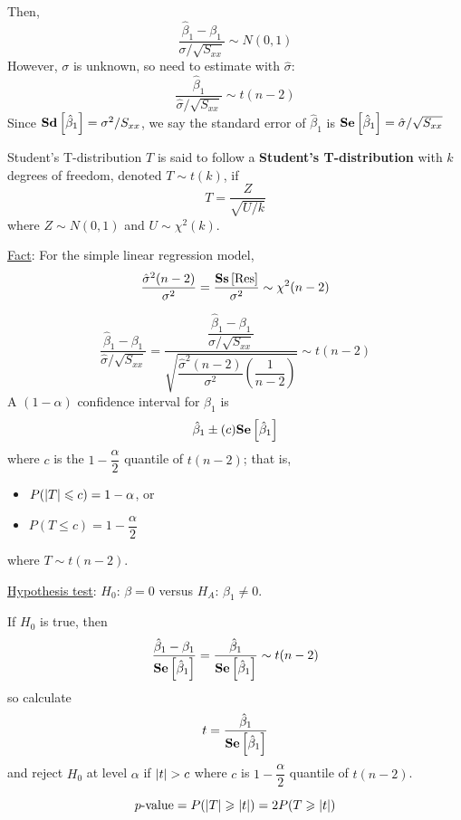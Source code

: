 Then,
\[ \frac{\hat{\beta}_1-\beta_1}{\sigma/\sqrt{S_{xx}}} \sim N(0,1)  \]
However, $ \sigma $ is unknown, so need to estimate
with $ \hat{\sigma} $:
\[ \frac{\hat{\beta}_1}{\hat{\sigma}/\sqrt{S_{xx}}}
    \sim t(n-2)  \]
Since $ \bm{\mathrm{Sd}}\left[\hat{\beta}_1\right]=\sigma^2/S_{xx} $,
we say the standard error of $ \hat{\beta}_1 $ is
$ \bm{\mathrm{Se}}\left[\hat{\beta}_1\right]=\hat{\sigma}/\sqrt{S_{xx}} $
\begin{Definition}{Student's T-distribution}{}
    $ T $ is said to follow a \textbf{Student's T-distribution} with
    $ k $ degrees of freedom, denoted $ T \sim t(k) $, if
    \[ T=\frac{Z}{\sqrt{U/k}}  \]
    where $ Z \sim N(0,1) $ and $ U \sim \chi^2(k) $.
\end{Definition}

\underline{Fact}\@: For the simple linear regression model,
\[ \frac{\hat{\sigma}^2(n-2)}{\sigma^2}=\frac{\bm{\mathrm{Ss}}\left[\text{Res}\right]}{\sigma^2}
    \sim \chi^2(n-2)  \]

\[ \frac{\hat{\beta}_1-\beta_1}{\hat{\sigma}/\sqrt{S_{xx}}}
    =\dfrac{\dfrac{\hat{\beta}_1-\beta_1}{\sigma/\sqrt{S_{xx}}}}{
        \sqrt{\dfrac{\hat{\sigma}^2(n-2)}{\sigma^2}\left( \dfrac{1}{n-2} \right)}
    } \sim t(n-2)  \]
A $ (1-\alpha) $ confidence interval for $ \beta_1 $ is
\[ \hat{\beta}_1\pm (c)\bm{\mathrm{Se}}\left[\hat{\beta}_1\right] \]
where $ c $ is the $ 1-\dfrac{\alpha}{2} $ quantile
of $ t(n-2) $; that is,
\begin{itemize}
    \item $ P(\lvert T\rvert\leqslant c)=1-\alpha $, or
    \item $ P(T\leqslant c)=1-\dfrac{\alpha}{2} $
\end{itemize}
where $ T \sim t(n-2) $.

\underline{Hypothesis test}:
$ H_0 $: $ \beta=0 $ versus
$ H_A $: $ \beta_1\neq 0 $.

If $ H_0 $ is true, then
\[ \frac{\hat{\beta}_1-\beta_1}{\bm{\mathrm{Se}}\left[\hat{\beta}_1\right]}
    =\frac{\hat{\beta}_1}{\bm{\mathrm{Se}}\left[\hat{\beta}_1\right]} \sim t(n-2)  \]
so calculate
\[ t=\frac{\hat{\beta}_1}{\bm{\mathrm{Se}}\left[\hat{\beta}_1\right]}  \]
and reject $ H_0 $ at level $ \alpha $ if $ \lvert t\rvert>c $
where $ c $ is $ 1-\dfrac{\alpha}{2} $ quantile of $ t(n-2) $.

\[ p\text{-value}=P(\lvert T\rvert\geqslant \lvert t\rvert)
    =2P(T\geqslant \lvert t\rvert) \]
